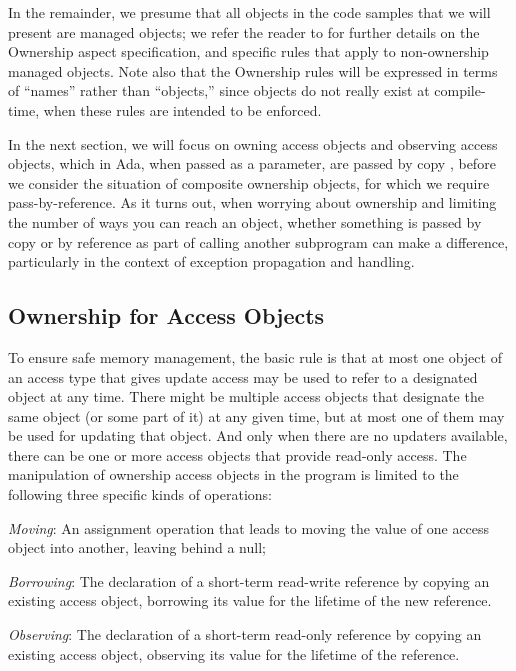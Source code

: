 \documentclass{llncs}
\begin{document}
\smallskip
In the remainder, we presume that all objects in the code samples that we will present are managed objects; we refer the reader to \cite{AI2017} for further details on
the Ownership aspect specification, and specific rules that apply to non-ownership managed objects. Note also that the Ownership rules will be expressed in terms
of ``names'' rather than ``objects,'' since objects do not really exist at compile-time, when these rules are intended to be enforced. 

\smallskip
In the next section, we will focus on owning access objects and observing access objects, which in Ada, when passed as a parameter, are passed by copy , before we
consider the situation of composite ownership objects, for which we require pass-by-reference.  As it turns out, when worrying about ownership and limiting the number of ways you can reach an object, whether something is passed by copy or by reference as part of calling another subprogram can make a difference, particularly in the context of exception propagation and handling.


\subsection{Ownership for Access Objects}
\label{subsec:ownershipAccess}

To ensure safe memory management, the basic rule is that at most one object of an access type that gives update access may be used to refer to a designated object at any time.  There might be multiple access objects that designate the same object (or some part of it) at any given time, but at most one of them may be used for updating that object.  And only when there are no updaters available, there can be one or more access objects that provide read-only access. The manipulation of ownership access objects in the program is limited to the following three specific kinds of operations:

\begin{compactitem}
  \item \textit{Moving}: An assignment operation that leads to moving the value of one access object into another, leaving behind a null;
  \item \textit{Borrowing}: The declaration of a short-term read-write reference by copying an existing access object, borrowing its value for the lifetime of the new reference. 
  \item \textit{Observing}: The declaration of a short-term read-only reference by copying an existing access object, observing its value for the lifetime of the reference. 
\end{compactitem}
\end{document}
